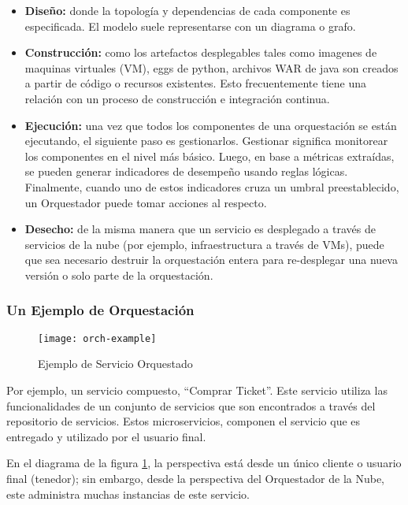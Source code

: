         \begin{itemize} 
        \item \textbf{Diseño: }donde la topología y dependencias de cada componente es especificada. El modelo suele representarse con un diagrama o grafo.
        
        \item \textbf{Construcción: }como los artefactos desplegables tales como imagenes de maquinas virtuales (VM), eggs de python, archivos WAR de java son creados a partir de código o recursos existentes. Esto frecuentemente tiene una relación con un proceso de construcción e integración continua.
        
        \item \textbf{Ejecución: }una vez que todos los componentes de una orquestación se están ejecutando, el siguiente paso es gestionarlos. Gestionar significa monitorear los componentes en el nivel más básico. Luego, en base a métricas extraídas, se pueden generar indicadores de desempeño usando reglas lógicas. Finalmente, cuando uno de estos indicadores cruza un umbral preestablecido, un Orquestador puede tomar acciones al respecto.
        
        \item \textbf{Desecho: }de la misma manera que un servicio es desplegado a través de servicios de la nube (por ejemplo, infraestructura a través de VMs), puede que sea necesario destruir la orquestación entera para re-desplegar una nueva versión o solo parte de la orquestación. 
        \end{itemize}

        \subsubsection{Un Ejemplo de Orquestación}
        \begin{figure}[H]
            \centering
            \texttt{[image: orch-example]}
            \caption{Ejemplo de Servicio Orquestado}
            \label{fig:orch-example}
        \end{figure}
        Por ejemplo, un servicio compuesto, “Comprar Ticket”. Este servicio utiliza las funcionalidades de un conjunto de servicios que son encontrados a través del repositorio de servicios. Estos microservicios, componen el servicio que es entregado y utilizado por el usuario final. 
        
        En el diagrama de la figura \ref{fig:orch-example}, la perspectiva está desde un único cliente o usuario final (tenedor); sin embargo, desde la perspectiva del Orquestador de la Nube, este administra muchas instancias de este servicio. 
        
